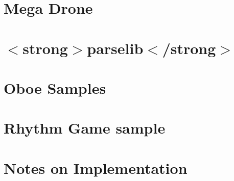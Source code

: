 \let\mypdfximage\pdfximage\def\pdfximage{\immediate\mypdfximage}\documentclass[twoside]{book}
\newcommand{\+}{\discretionary{\mbox{\scriptsize$\hookleftarrow$}}{}{}}
\begin{document}
\chapter{Mega Drone}
\label{md__c_1__users_fab_src__github_branches__neural_amp_modeler_plugin_i_plug2__dependencies__build_c6b077472baaa87c153aeaa414ae5916}

\chapter{$<$strong$>$parselib$<$/strong$>$}
\label{md__c_1__users_fab_src__github_branches__neural_amp_modeler_plugin_i_plug2__dependencies__build_fbbed651e96257596063352757ffd95b}

\chapter{Oboe Samples}
\label{md__c_1__users_fab_src__github_branches__neural_amp_modeler_plugin_i_plug2__dependencies__build_dcdac3819ffdad1bc2acd78febd5b3ca}

\chapter{Rhythm Game sample}
\label{md__c_1__users_fab_src__github_branches__neural_amp_modeler_plugin_i_plug2__dependencies__build_c401f29be09a3226d7b406f9de78f7a7}

\chapter{Notes on Implementation}
\label{md__c_1__users_fab_src__github_branches__neural_amp_modeler_plugin_i_plug2__dependencies__build_6eee3ae5d77504b18e6322c2014d6185}

\end{document}

